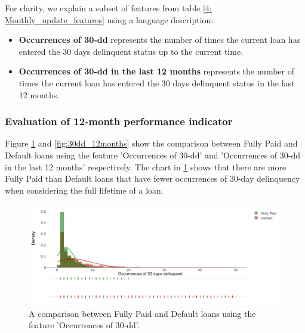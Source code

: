 
            For clarity, we explain a subset of features from table \ref{4: Monthly_update_features} using a language description:
            
            \begin{itemize}
              \item \textbf{Occurrences of 30-dd} represents the number of times the current loan has entered the 30 days delinquent status up to the current time. 
              \item \textbf{Occurrences of 30-dd in the last 12 months} represents the number of times the current loan has entered the 30 days delinquent status in the last 12 months. 
            \end{itemize}
            
            \clearpage
            
            \subsubsection{Evaluation of 12-month performance indicator}
            
            Figure \ref{fig:30dd} and \ref{fig:30dd_12months} show the comparison between Fully Paid and Default loans using the feature 'Occurrences of 30-dd' and 'Occurrences of 30-dd in the last 12 months' respectively. The chart in \ref{fig:30dd} shows that there are more Fully Paid than Default loans that have fewer occurrences of 30-day delinquency when considering the full lifetime of a loan. 
            
            
            
            \begin{figure}[H]
                \centering
                \includegraphics[width=0.99\textwidth]{Images/occur_30_dd_dist.png}
                \caption{A comparison between Fully Paid and Default loans using the feature 'Occurrences of 30-dd'.}
                \label{fig:30dd}
            \end{figure}
            
